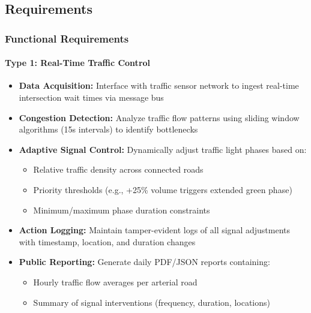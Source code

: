 \documentclass[11.5pt]{article}
\begin{document}
    \subsection{Requirements}
    \subsubsection{Functional Requirements}
    
    \paragraph{Type 1: Real-Time Traffic Control}
    \begin{itemize}
        \item \textbf{Data Acquisition:} Interface with traffic sensor network to ingest real-time intersection wait times via message bus
        \item \textbf{Congestion Detection:} Analyze traffic flow patterns using sliding window algorithms (15s intervals) to identify bottlenecks
        \item \textbf{Adaptive Signal Control:} Dynamically adjust traffic light phases based on:
        \begin{itemize}
            \item Relative traffic density across connected roads
            \item Priority thresholds (e.g., +25\% volume triggers extended green phase)
            \item Minimum/maximum phase duration constraints
        \end{itemize}
        \item \textbf{Action Logging:} Maintain tamper-evident logs of all signal adjustments with timestamp, location, and duration changes
        \item \textbf{Public Reporting:} Generate daily PDF/JSON reports containing:
        \begin{itemize}
            \item Hourly traffic flow averages per arterial road
            \item Summary of signal interventions (frequency, duration, locations)
        \end{itemize}
    \end{itemize}
    
\end{document}
